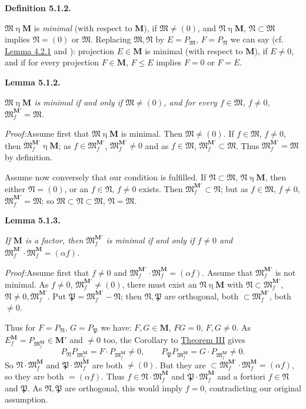 \documentclass[12pt,b5paper,twoside]{article}
\newcommand{\M}{\mathbf M}
\newcommand{\Definition}[1]{%
  \par\smallskip\noindent\phantomsection\label{def:#1}\textbf{Definition #1.}\enspace
}
\newcommand{\Lemma}[1]{%
  \par\smallskip\noindent\phantomsection\label{lem:#1}\textbf{Lemma #1.}\enspace
}
\newcommand{\Proof}{\par\noindent\textit{Proof:}\enspace}
\newcommand{\lemref}[1]{\hyperref[lem:#1]{Lemma #1}}
\newcommand{\thmref}[1]{\hyperref[thm:#1]{Theorem #1}}
\begin{document}
\Definition{5.1.2}
$\mathfrak M\mathrel\eta\M$ is \emph{minimal} (with respect to $\M$), if
$\mathfrak M\neq(0)$, and $\mathfrak N\mathrel\eta\M$,
$\mathfrak N\subset\mathfrak M$ implies $\mathfrak N=(0)$ or
$\mathfrak M$. Replacing $\mathfrak M,\mathfrak N$ by
$E=P_{\mathfrak M}$, $F=P_{\mathfrak N}$ we can say (cf. \lemref{4.2.1} and
\cite[p.~76]{ref16}): projection $E\in\M$ is minimal (with respect to $\M$),
if $E\neq0$, and if for every projection $F\in\M$, $F\leq E$ implies $F=0$
or $F=E$.

\Lemma{5.1.2}
\emph{$\mathfrak M\mathrel\eta\M$ is minimal if and only if
$\mathfrak M\neq(0)$, and for every $f\in\mathfrak M$, $f\neq0$,
$\mathfrak M_f^{\M'}=\mathfrak M$.}

\Proof Assume first that $\mathfrak M\mathrel\eta\M$ is minimal. Then
$\mathfrak M\neq(0)$. If $f\in\mathfrak M$, $f\neq0$, then
$\mathfrak M_f^{\M'}\mathrel\eta\M$; as
$f\in\mathfrak M_f^{\M'}$, $\mathfrak M_f^{\M'}\neq0$ and as
$f\in\mathfrak M$, $\mathfrak M_f^{\M'}\subset\mathfrak M$. Thus
$\mathfrak M_f^{\M'}=\mathfrak M$ by definition.

Assume now conversely that our condition is fulfilled. If
$\mathfrak N\subset\mathfrak M$, $\mathfrak N\mathrel\eta\M$, then either
$\mathfrak N=(0)$, or an $f\in\mathfrak N$, $f\neq0$ exists. Then
$\mathfrak M_f^{\M'}\subset\mathfrak N$; but as $f\in\mathfrak M$,
$f\neq0$, $\mathfrak M_f^{\M'}=\mathfrak M$; so
$\mathfrak M\subset\mathfrak N\subset\mathfrak M$,
$\mathfrak N=\mathfrak M$.

\Lemma{5.1.3}
\emph{If $\M$ is a factor, then $\mathfrak M_f^{\M'}$ is minimal if and only
if $f\neq0$ and
$\mathfrak M_f^{\M'}\cdot\mathfrak M_f^{\M}=(\alpha f)$.}

\Proof Assume first that $f\neq0$ and
$\mathfrak M_f^{\M'}\cdot\mathfrak M_f^{\M}=(\alpha f)$. Assume that
$\mathfrak M_f^{\M'}$ is not minimal. As $f\neq0$,
$\mathfrak M_f^{\M'}\neq(0)$, there must exist an
$\mathfrak N\mathrel\eta\M$ with
$\mathfrak N\subset\mathfrak M_f^{\M'}$,
$\mathfrak N\neq0,\mathfrak M_f^{\M'}$. Put
$\mathfrak P=\mathfrak M_f^{\M'}-\mathfrak N$; then $\mathfrak N,\mathfrak P$
are orthogonal, both $\subset\mathfrak M_f^{\M'}$, both $\neq0$.

Thus for $F=P_{\mathfrak N}$, $G=P_{\mathfrak P}$ we have:
$F,G\in\M$, $FG=0$, $F,G\neq0$. As
$E_f^{\M}=P_{\mathfrak M_f^{\M}}\in\M'$ and $\neq0$ too, the Corollary to
\thmref{III} gives
\[
 P_{\mathfrak N}P_{\mathfrak M_f^{\M}}
 =F\cdot P_{\mathfrak M_f^{\M}}\neq0,
 \qquad
 P_{\mathfrak P}P_{\mathfrak M_f^{\M}}
 =G\cdot P_{\mathfrak M_f^{\M}}\neq0.
\]
So $\mathfrak N\cdot\mathfrak M_f^{\M}$ and
$\mathfrak P\cdot\mathfrak M_f^{\M}$ are both $\neq(0)$. But they are
$\subset\mathfrak M_f^{\M'}\cdot\mathfrak M_f^{\M}=(\alpha f)$, so they
are both $=(\alpha f)$. Thus
$f\in\mathfrak N\cdot\mathfrak M_f^{\M}$ and
$\mathfrak P\cdot\mathfrak M_f^{\M}$ and a fortiori
$f\in\mathfrak N$ and $\mathfrak P$. As $\mathfrak N,\mathfrak P$ are
orthogonal, this would imply $f=0$, contradicting our original assumption.
\end{document}
